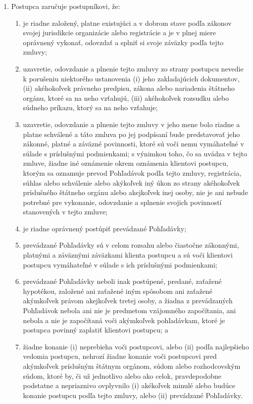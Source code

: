 \documentclass[a4paper]{article}
\begin{document}
\begin{multicols}{2}
\begin{enumerate}
    \item{	Postupca zaručuje postupníkovi, že:}
    \begin{enumerate}
        \item{je riadne založený, platne existujúci a v dobrom stave podľa zákonov svojej jurisdikcie organizácie alebo registrácie a je v plnej miere oprávnený vykonať, odovzdať a splniť si svoje záväzky podľa tejto zmluvy;}
        \item{uzavretie, odovzdanie a plnenie tejto zmluvy zo strany postupcu nevedie k porušeniu niektorého ustanovenia (i) jeho zakladajúcich dokumentov, (ii) akéhokoľvek právneho predpisu, zákona alebo nariadenia štátneho orgánu, ktoré sa na neho vzťahujú, (iii) akéhokoľvek rozsudku alebo súdneho príkazu, ktorý sa na neho vzťahuje;}
        \item{uzavretie, odovzdanie a plnenie tejto zmluvy v jeho mene bolo riadne a platne schválené a táto zmluva po jej podpísaní bude predstavovať jeho zákonné, platné a záväzné povinnosti, ktoré sú voči nemu vymáhateľné v súlade s príslušnými podmienkami; s výnimkou toho, čo sa uvádza v tejto zmluve, žiadne iné oznámenie okrem oznámenia klientovi postupcu, ktorým sa oznamuje prevod Pohľadávok podľa tejto zmluvy, registrácia, súhlas alebo schválenie alebo akýkoľvek iný úkon zo strany akéhokoľvek príslušného štátneho orgánu alebo akejkoľvek inej osoby, nie je ani nebude potrebné pre vykonanie, odovzdanie a splnenie svojich povinností stanovených v tejto zmluve;}
        \item{je riadne oprávnený postúpiť prevádzané Pohľadávky;}
        \item{prevádzané Pohľadávky sú v celom rozsahu alebo čiastočne zákonnými, platnými a záväznými záväzkami klienta postupcu a sú voči klientovi postupcu vymáhateľné v súlade s ich príslušnými podmienkami;}
        \item{prevádzané Pohľadávky neboli inak postúpené, predané, zaťažené hypotékou, založené ani zaťažené iným spôsobom ani zaťažené akýmkoľvek právom akejkoľvek tretej osoby, a žiadna z prevádzaných Pohľadávok nebola ani nie je predmetom vzájomného započítania, ani nebola a nie je započítaná voči akýmkoľvek pohľadávkam, ktoré je postupca povinný zaplatiť klientovi postupcu; a}
        \item{žiadne konanie (i) neprebieha voči postupcovi, alebo (ii) podľa najlepšieho vedomia postupcu, nehrozí žiadne konanie voči postupcovi pred akýmkoľvek príslušným štátnym orgánom, súdom alebo rozhodcovským súdom, ktoré by, či už jednotlivo alebo ako celok, pravdepodobne podstatne a nepriaznivo ovplyvnilo (i) akékoľvek minulé alebo budúce konanie postupcu podľa tejto zmluvy, alebo (ii) prevádzané Pohľadávky. }
    \end{enumerate}
\end{enumerate}


\end{multicols}
\end{document}
